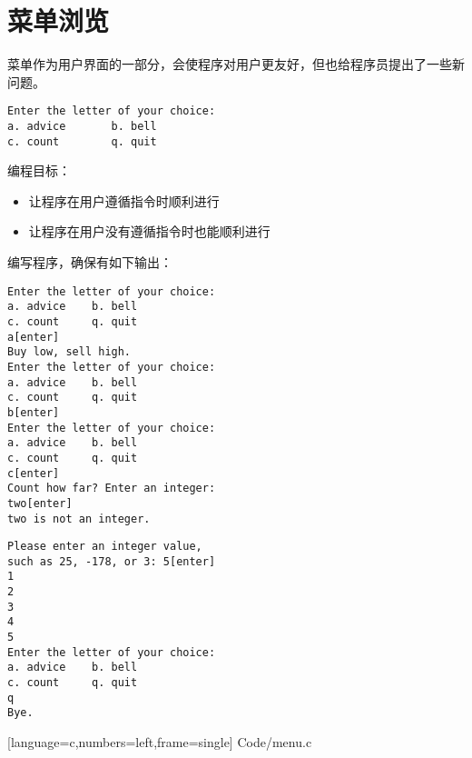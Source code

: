 \section{菜单浏览}
\begin{frame}[fragile]\ft{\secname}
菜单作为用户界面的一部分，会使程序对用户更友好，但也给程序员提出了一些新问题。
\begin{lstlisting}
Enter the letter of your choice:
a. advice       b. bell
c. count        q. quit   
\end{lstlisting}
编程目标：
\begin{itemize}
\item 让程序在用户遵循指令时顺利进行
\item 让程序在用户没有遵循指令时也能顺利进行
\end{itemize}
\end{frame}

\begin{frame}[fragile]\ft{\secname}
编写程序，确保有如下输出：
\end{frame}

\begin{frame}[fragile]\ft{\secname}
\begin{lstlisting}
Enter the letter of your choice:
a. advice    b. bell
c. count     q. quit
a[enter]
Buy low, sell high.
Enter the letter of your choice:
a. advice    b. bell
c. count     q. quit
b[enter]
Enter the letter of your choice:
a. advice    b. bell
c. count     q. quit
c[enter]
Count how far? Enter an integer:
two[enter]
two is not an integer.
\end{lstlisting}
\end{frame}

\begin{frame}[fragile]\ft{\secname}
\begin{lstlisting}
Please enter an integer value, 
such as 25, -178, or 3: 5[enter]
1
2
3
4
5
Enter the letter of your choice:
a. advice    b. bell
c. count     q. quit
q
Bye.
\end{lstlisting}
\end{frame}

\begin{frame}\ft{\secname}

[language=c,numbers=left,frame=single]
{Code/menu.c}
\end{frame}

